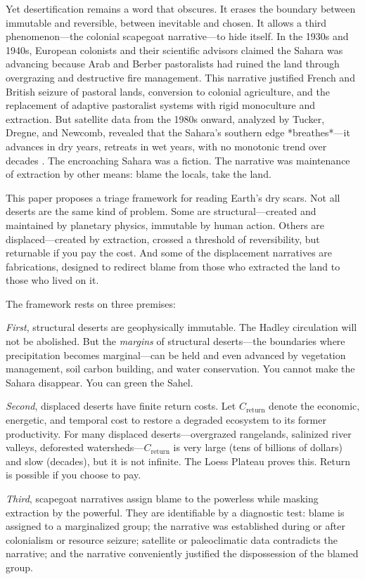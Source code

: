 \documentclass[12pt,a4paper]{article}
\begin{document}
Yet desertification remains a word that obscures. It erases the boundary between immutable and reversible, between inevitable and chosen. It allows a third phenomenon—the colonial scapegoat narrative—to hide itself. In the 1930s and 1940s, European colonists and their scientific advisors claimed the Sahara was advancing because Arab and Berber pastoralists had ruined the land through overgrazing and destructive fire management. This narrative justified French and British seizure of pastoral lands, conversion to colonial agriculture, and the replacement of adaptive pastoralist systems with rigid monoculture and extraction. But satellite data from the 1980s onward, analyzed by Tucker, Dregne, and Newcomb, revealed that the Sahara's southern edge *breathes*—it advances in dry years, retreats in wet years, with no monotonic trend over decades \citep{Tucker:1991}. The encroaching Sahara was a fiction. The narrative was maintenance of extraction by other means: blame the locals, take the land.

This paper proposes a triage framework for reading Earth's dry scars. Not all deserts are the same kind of problem. Some are structural—created and maintained by planetary physics, immutable by human action. Others are displaced—created by extraction, crossed a threshold of reversibility, but returnable if you pay the cost. And some of the displacement narratives are fabrications, designed to redirect blame from those who extracted the land to those who lived on it.

The framework rests on three premises:

\textit{First}, structural deserts are geophysically immutable. The Hadley circulation will not be abolished. But the \textit{margins} of structural deserts—the boundaries where precipitation becomes marginal—can be held and even advanced by vegetation management, soil carbon building, and water conservation. You cannot make the Sahara disappear. You can green the Sahel.

\textit{Second}, displaced deserts have finite return costs. Let $C_{\text{return}}$ denote the economic, energetic, and temporal cost to restore a degraded ecosystem to its former productivity. For many displaced deserts—overgrazed rangelands, salinized river valleys, deforested watersheds—$C_{\text{return}}$ is very large (tens of billions of dollars) and slow (decades), but it is not infinite. The Loess Plateau proves this. Return is possible if you choose to pay.

\textit{Third}, scapegoat narratives assign blame to the powerless while masking extraction by the powerful. They are identifiable by a diagnostic test: blame is assigned to a marginalized group; the narrative was established during or after colonialism or resource seizure; satellite or paleoclimatic data contradicts the narrative; and the narrative conveniently justified the dispossession of the blamed group.
\end{document}
